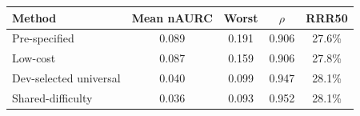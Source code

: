 \begin{tabular}{lcccc}
\toprule
Method & Mean nAURC & Worst & $\rho$ & RRR50 \\
\midrule
Pre-specified & 0.089 & 0.191 & 0.906 & 27.6\% \\
Low-cost & 0.087 & 0.159 & 0.906 & 27.8\% \\
Dev-selected universal & 0.040 & 0.099 & 0.947 & 28.1\% \\
Shared-difficulty & 0.036 & 0.093 & 0.952 & 28.1\% \\
\bottomrule
\end{tabular}
